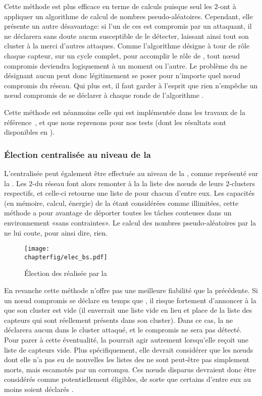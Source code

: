 Cette méthode est plus efficace en terme de calculs puisque seul les $2$-\CH ont à appliquer un algorithme de calcul de nombres pseudo-aléatoires.
Cependant, elle présente un autre désavantage: si l'un de ces \CH est compromis par un attaquant, il ne déclarera sans doute aucun \cn susceptible de le détecter, laissant ainsi tout son cluster à la merci d'autres attaques.
Comme l'algorithme \leach désigne à tour de rôle chaque capteur, sur un cycle complet, pour accomplir le rôle de \CH, tout nœud compromis deviendra logiquement \CH à un moment ou l'autre.
Le problème du \CH ne désignant aucun \cn peut donc légitimement se poser pour n'importe quel nœud compromis du réseau.
Qui plus est, il faut garder à l'esprit que rien n'empêche un nœud compromis de se déclarer \ch à chaque ronde de l'algorithme \leach.

Cette méthode est néanmoins celle qui est implémentée dans les travaux de la référence~\cite{GMT12}, et que nous reprenons pour nos tests (dont les résultats sont disponibles en ).

        \subsubsection{Élection centralisée au niveau de la \sdb}
L'\election centralisée peut également être effectuée au niveau de la \sdb, comme représenté sur la .
Les $2$-\CH du réseau font alors remonter à la \sdb la liste des nœuds de leurs $2$-clusters respectifs, et celle-ci retourne une liste de \cns pour chacun d'entre eux.
Les capacités (en mémoire, calcul, énergie) de la \sdb étant considérées comme illimitées, cette méthode a pour avantage de déporter toutes les tâches couteuses dans un environnement «sans contraintes».
Le calcul des nombres pseudo-aléatoires par la \sdb ne lui coute, pour ainsi dire, rien.
\begin{figure}[ht]
    \centering
    \texttt{[image: \\chapterfig/elec\_bs.pdf]}
    \caption{Élection des \cns réalisée par la \sdb}\label{sa:fig:elecbs}
\end{figure}

En revanche cette méthode n'offre pas une meilleure fiabilité que la précédente.
Si un nœud compromis se déclare en temps que \CH, il risque fortement d'annoncer à la \sdb que son cluster est vide (il enverrait une liste vide en lieu et place de la liste des capteurs qui sont réellement présents dans son cluster).
Dans ce cas, la \sdb ne déclarera aucun \cn dans le cluster attaqué, et le \CH compromis ne sera pas détecté.
Pour parer à cette éventualité, la \sdb pourrait agir autrement lorsqu'elle reçoit une liste de capteurs vide.
Plus spécifiquement, elle devrait considérer que les nœuds dont elle n'a pas eu de nouvelles \via les listes des \CH ne sont peut-être pas simplement morts, mais escamotés par un \ch corrompu.
Ces nœuds disparus devraient donc être considérés comme potentiellement éligibles, de sorte que certains d'entre eux au moins soient déclarés \cns.

